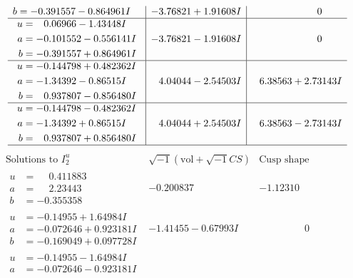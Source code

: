 \documentclass[1p]{elsarticle_modified}
\theoremstyle{definition}
\newcommand{\I}{\sqrt{-1}}
\begin{document}
$$\begin{array}{c|c|c}
\begin{aligned}
b &= -0.391557 - 0.864961 I\end{aligned}
 & -3.76821 + 1.91608 I & \phantom{-0.000000 } 0 \\ \hline\begin{aligned}
u &= \phantom{-}0.06966 - 1.43448 I \\
a &= -0.101552 - 0.556141 I \\
b &= -0.391557 + 0.864961 I\end{aligned}
 & -3.76821 - 1.91608 I & \phantom{-0.000000 } 0 \\ \hline\begin{aligned}
u &= -0.144798 + 0.482362 I \\
a &= -1.34392 - 0.86515 I \\
b &= \phantom{-}0.937807 - 0.856480 I\end{aligned}
 & \phantom{-}4.04044 - 2.54503 I & \phantom{-}6.38563 + 2.73143 I \\ \hline\begin{aligned}
u &= -0.144798 - 0.482362 I \\
a &= -1.34392 + 0.86515 I \\
b &= \phantom{-}0.937807 + 0.856480 I\end{aligned}
 & \phantom{-}4.04044 + 2.54503 I & \phantom{-}6.38563 - 2.73143 I\\
 \hline 
 \end{array}$$\newpage$$\begin{array}{c|c|c}  
\text{Solutions to }I^u_{2}& \I (\text{vol} + \sqrt{-1}CS) & \text{Cusp shape}\\
 \hline 
\begin{aligned}
u &= \phantom{-}0.411883\phantom{ +0.000000I} \\
a &= \phantom{-}2.23443\phantom{ +0.000000I} \\
b &= -0.355358\phantom{ +0.000000I}\end{aligned}
 & -0.200837\phantom{ +0.000000I} & -1.12310\phantom{ +0.000000I} \\ \hline\begin{aligned}
u &= -0.14955 + 1.64984 I \\
a &= -0.072646 + 0.923181 I \\
b &= -0.169049 + 0.097728 I\end{aligned}
 & -1.41455 - 0.67993 I & \phantom{-0.000000 } 0 \\ \hline\begin{aligned}
u &= -0.14955 - 1.64984 I \\
a &= -0.072646 - 0.923181 I \\

\end{aligned}
\end{array}$$
\end{document}
